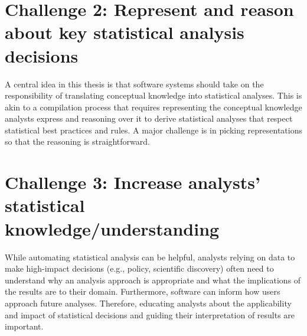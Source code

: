 


\section*{Challenge 2: Represent and reason about key statistical analysis decisions} %
A central idea in this thesis is that software systems should take on the
responsibility of translating conceptual knowledge into statistical analyses.
This is akin to a compilation process that requires representing the conceptual
knowledge analysts express and reasoning over it to derive statistical
analyses that respect statistical best practices and rules. A
major challenge is in picking representations so that the reasoning is straightforward. 

\section*{Challenge 3: Increase analysts' statistical knowledge/understanding} %
While automating statistical analysis can be helpful, analysts relying on data
to make high-impact decisions (e.g., policy, scientific discovery) often need to
understand why an analysis approach is appropriate and what the implications of
the results are to their domain. Furthermore, software can inform how users
approach future analyses. Therefore, educating analysts about the applicability
and impact of statistical decisions and guiding their interpretation of results
are important.

